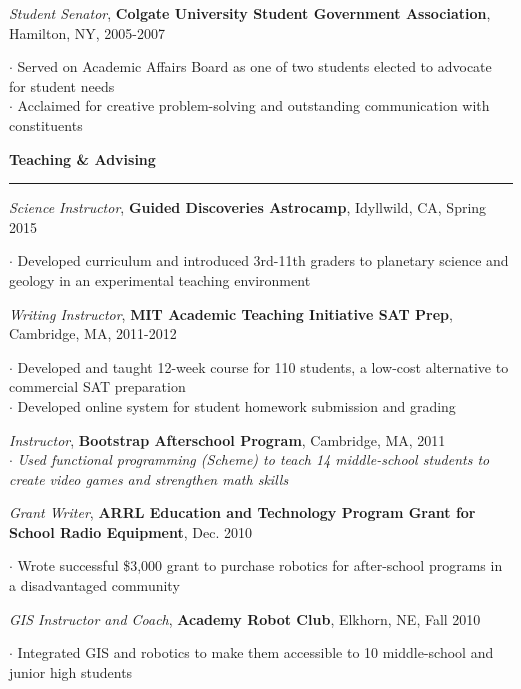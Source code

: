 \documentclass[10pt]{article}
\begin{document}
\emph{Student Senator}, \textbf{Colgate University Student Government Association}, Hamilton, NY, 2005-2007  \\
\begin{small}$\cdot$ {Served on Academic Affairs Board as one of two students elected to advocate for student needs }\\
$\cdot$ {Acclaimed for creative problem-solving and outstanding communication with constituents }\end{small}

\vspace*{0.25 mm}
\textbf{Teaching \& Advising}
\smallskip
\hrule
\emph{Science Instructor}, \textbf{Guided Discoveries Astrocamp}, Idyllwild, CA, Spring 2015\\
\begin{small}$\cdot$ {Developed curriculum and introduced 3rd-11th graders to planetary science and geology in an experimental teaching environment}\end{small}

\emph{Writing Instructor}, \textbf{MIT Academic Teaching Initiative SAT Prep}, Cambridge, MA, 2011-2012\\
\begin{small}$\cdot$ {Developed and taught 12-week course for 110 students, a low-cost alternative to commercial SAT preparation}\\
$\cdot$ {Developed online system for student homework submission and grading}\end{small}

\emph{Instructor}, \textbf{Bootstrap Afterschool Program}, Cambridge, MA, 2011\\
$\cdot$ \emph{Used functional programming (Scheme) to teach 14 middle-school students to create video games and strengthen math skills}

\emph{Grant Writer}, \textbf{ARRL Education and Technology Program Grant for School Radio Equipment}, Dec. 2010\\
\begin{small}$\cdot$ {Wrote successful \$3,000 grant to purchase robotics for after-school programs in a disadvantaged community}\end{small}

\emph{GIS Instructor and Coach}, \textbf{Academy Robot Club}, Elkhorn, NE, Fall 2010\\
\begin{small}$\cdot$ {Integrated GIS and robotics to  make them accessible to 10 middle-school and junior high students}\end{small}
\end{document}
